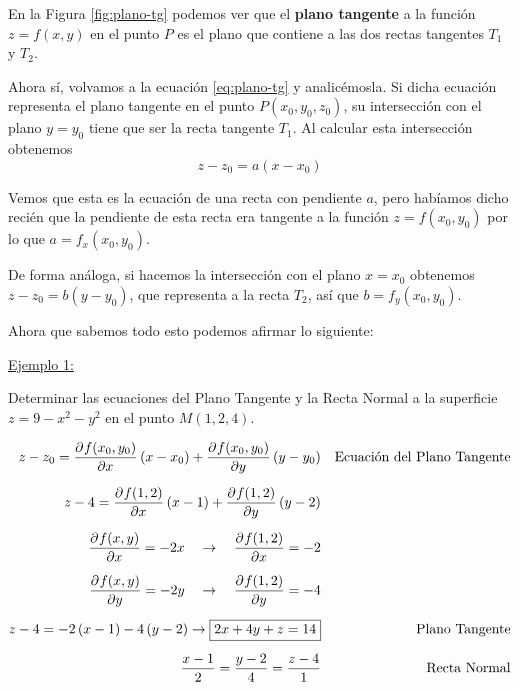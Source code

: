 \documentclass[12pt]{article}
\begin{document}
En la Figura \ref{fig:plano-tg} podemos ver que el \textbf{plano tangente} a la función $ z=f(x,y) $ en el punto $ P $ es el plano que contiene a las dos rectas tangentes $ T_{1} $ y $ T_{2} $.

Ahora sí, volvamos a la ecuación \ref{eq:plano-tg} y analicémosla. Si dicha ecuación representa el plano tangente en el punto $ P(x_{0},y_{0},z_{0}) $, su intersección con el plano $ y=y_{0} $ tiene que ser la recta tangente $ T_{1} $. Al calcular esta intersección obtenemos
\[
z-z_{0} = a\left(x-x_{0}\right)
\]

Vemos que esta es la ecuación de una recta con pendiente $ a $, pero habíamos dicho recién que la pendiente de esta recta era tangente a la función $ z=f(x_{0},y_{0}) $ por lo que $ a=f_{x}(x_{0},y_{0}) $.

De forma análoga, si hacemos la intersección con el plano $ x=x_{0} $ obtenemos $ z-z_{0}=b\left(y-y_{0}\right) $, que representa a la recta $ T_{2} $, así que $ b=f_{y}(x_{0},y_{0}) $.

Ahora que sabemos todo esto podemos afirmar lo siguiente:

\vspace{0.2cm}
\vspace{0.2cm}

\underline{Ejemplo 1:}

Determinar las ecuaciones del Plano Tangente y la Recta Normal a la superficie $ z = 9 - x^2 - y^2 $ en el punto $ M(1,2,4) $.

\begin{align*}
	z - z_{0} = \pdv[]{f(x_{0}, y_{0})}{x} \left(x-x_{0}\right) + \pdv[]{f(x_{0}, y_{0})}{y}\left(y - y_{0}\right) && \text{Ecuación del Plano Tangente}\\[0.2cm]
	z - 4 = \pdv[]{f(1, 2)}{x} \left(x-1\right) + \pdv[]{f(1, 2)}{y}\left(y - 2\right)&&\\[0.2cm]
	\pdv[]{f(x,y)}{x} = -2x \quad \to \quad \pdv[]{f(1,2)}{x}  = -2&&\\[0.2cm]
	\pdv[]{f(x,y)}{y} = -2y \quad \to \quad \pdv[]{f(1,2)}{y}  = -4&&\\[0.2cm]
	z-4 = -2\left(x-1\right) - 4\left(y-2\right)  \to \boxed{2x+4y+z=14} && \text{Plano Tangente}\\[0.2cm]
	\frac{x-1}{2} = \frac{y-2}{4} = \frac{z-4}{1} &&\text{Recta Normal}
\end{align*} 
\end{document}
